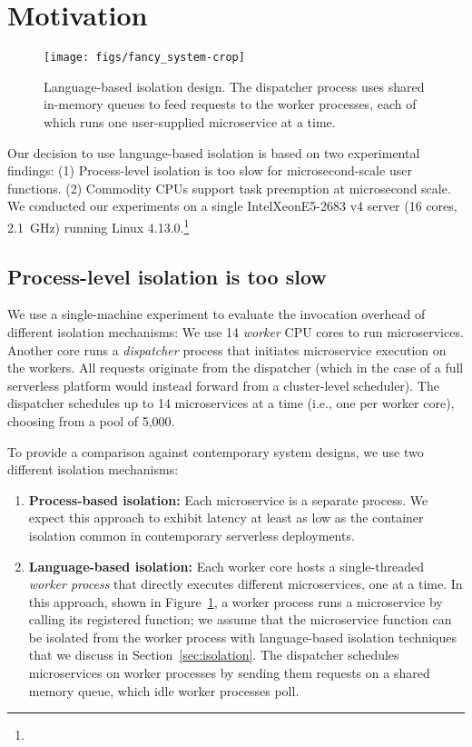 \section{Motivation}
\label{sec:motive}

\begin{figure}
\texttt{[image: figs/fancy\_system-crop]}
\caption{Language-based isolation design.  The dispatcher process
uses shared in-memory queues to feed requests to the worker processes, each of
which runs one user-supplied microservice at a time.}
\label{fig:sysdesign}
\end{figure}

Our decision to use language-based isolation is based on two experimental
findings:  (1) Process-level isolation is too slow for
microsecond-scale user functions. (2) Commodity
CPUs support task preemption at microsecond scale.  We conducted our experiments
on a single Intel\textcopyright\@ Xeon\textcopyright\@ E5-2683 v4 server (16 cores, 2.1~GHz) running
Linux 4.13.0.\footnote{}

\subsection{Process-level isolation is too slow}
We use a single-machine experiment to evaluate the invocation overhead of different
isolation mechanisms: We use 14 \emph{worker} CPU cores to run microservices. Another
core runs a \emph{dispatcher} process that initiates microservice execution on the
workers.  All requests originate
from the dispatcher (which in the case of a full serverless platform would instead
forward from a cluster-level scheduler).  The dispatcher schedules up to 14
microservices at a time (i.e., one per worker core), choosing from a pool of 5,000.

To provide a comparison against contemporary system designs, we use two different
isolation mechanisms:
\begin{enumerate}
\item \textbf{Process-based isolation:} Each microservice is a separate process.
We expect this approach to exhibit latency at least as low as the container isolation
common in contemporary serverless deployments.
\item \textbf{Language-based isolation:} Each worker core hosts a single-threaded
\emph{worker process} that directly executes different microservices, one at a time.
In this approach, shown in Figure~\ref{fig:sysdesign}, a worker process runs a
microservice by calling its registered
function; we assume that the microservice function can be isolated from the
worker process with language-based isolation techniques that we discuss in
Section~\ref{sec:isolation}. The dispatcher schedules microservices on worker
processes by sending them
requests on a shared memory queue, which idle worker processes poll.
\end{enumerate}

